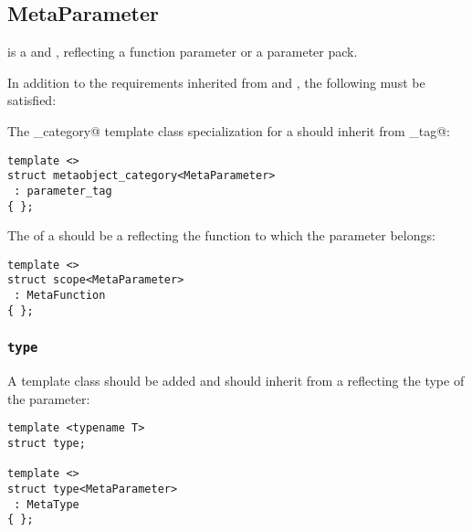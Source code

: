 \subsection{MetaParameter}
\label{concept-MetaParameter}


 is a  and ,
reflecting a function parameter or a parameter pack.

In addition to the requirements inherited from  and ,
the following must be satisfied:

The \verb@metaobject_category@ template class specialization for a  should
inherit from \verb@parameter_tag@:

\begin{verbatim}
template <>
struct metaobject_category<MetaParameter>
 : parameter_tag
{ };
\end{verbatim}

The \verb@scope@ of a  should be a  reflecting
the function to which the parameter belongs:

\begin{verbatim}
template <>
struct scope<MetaParameter>
 : MetaFunction
{ };
\end{verbatim}

\subsubsection{\texttt{type}}

A template class \verb@type@ should be added and should inherit
from a  reflecting the type of the parameter:

\begin{verbatim}
template <typename T>
struct type;

template <>
struct type<MetaParameter>
 : MetaType
{ };
\end{verbatim}

